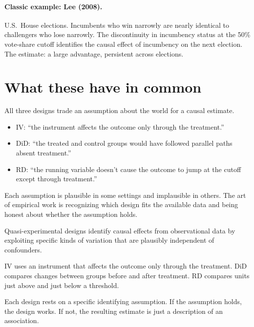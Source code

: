 \paragraph{Classic example: Lee (2008).} U.S.\ House elections. Incumbents who win narrowly are nearly identical to challengers who lose narrowly. The discontinuity in incumbency status at the 50\% vote-share cutoff identifies the causal effect of incumbency on the next election. The estimate: a large advantage, persistent across elections.

\section{What these have in common}

All three designs trade an assumption about the world for a causal estimate.

\begin{itemize}[noitemsep]
\item IV: ``the instrument affects the outcome only through the treatment.''
\item DiD: ``the treated and control groups would have followed parallel paths absent treatment.''
\item RD: ``the running variable doesn't cause the outcome to jump at the cutoff except through treatment.''
\end{itemize}

Each assumption is plausible in some settings and implausible in others. The art of empirical work is recognizing which design fits the available data and being honest about whether the assumption holds.

\begin{keyinsight}
Quasi-experimental designs identify causal effects from observational data by exploiting specific kinds of variation that are plausibly independent of confounders.

IV uses an instrument that affects the outcome only through the treatment. DiD compares changes between groups before and after treatment. RD compares units just above and just below a threshold.

Each design rests on a specific identifying assumption. If the assumption holds, the design works. If not, the resulting estimate is just a description of an association.
\end{keyinsight}

